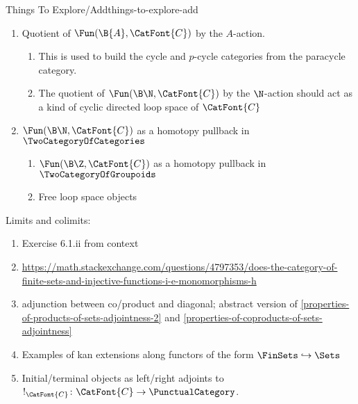 \begin{remark}{Things To Explore/Add}{things-to-explore-add}
\begin{enumerate}
\begin{enumerate}
                \item Quotients of categories by actions of monoids $\B{A}$
                \item Quotients of categories by actions of monoids $A_{\disc}$
                \item Lax, oplax, pseudo, strict, etc.\ quotients of categories
                \item lax Kan extensions along $\B{\CatFont{C}}\to\B{\CatFont{D}}$ for $\CatFont{C}\to\CatFont{D}$ a monoidal functor
            \end{enumerate}
        \item Quotient of $\Fun(\B{A},\CatFont{C})$ by the $A$-action.
            \begin{enumerate}
                \item This is used to build the cycle and $p$-cycle categories from the paracycle category.
                \item The quotient of $\Fun(\B\N,\CatFont{C})$ by the $\N$-action should act as a kind of cyclic directed loop space of $\CatFont{C}$
            \end{enumerate}
        \item $\Fun(\B\N,\CatFont{C})$ as a homotopy pullback in $\TwoCategoryOfCategories$
            \begin{enumerate}
                \item $\Fun(\B\Z,\CatFont{C})$ as a homotopy pullback in $\TwoCategoryOfGroupoids$
                \item Free loop space objects
            \end{enumerate}
    \end{enumerate}
    Limits and colimits:
    \begin{enumerate}
        \item Exercise 6.1.ii from context
        \item \url{https://math.stackexchange.com/questions/4797353/does-the-category-of-finite-sets-and-injective-functions-i-e-monomorphisms-h}
        \item adjunction between co/product and diagonal; abstract version of \cref{properties-of-products-of-sets-adjointness-2} and \cref{properties-of-coproducts-of-sets-adjointness}
        \item Examples of kan extensions along functors of the form $\FinSets\hookrightarrow\Sets$
        \item Initial/terminal objects as left/right adjoints to $!_{\CatFont{C}}\colon\CatFont{C}\to\PunctualCategory$.

\end{enumerate}
\end{remark}
